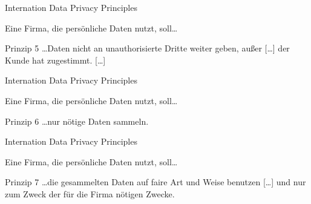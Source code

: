 \begin{frame}{Internation Data Privacy Principles}


    Eine Firma, die persönliche Daten nutzt, soll\dots

    \begin{block}{Prinzip 5 \cite{zankl_international_2014}}
        \dots Daten nicht an unauthorisierte Dritte weiter geben, außer [\dots] der Kunde hat zugestimmt. [\dots] 
    \end{block}


\end{frame}

\begin{frame}{Internation Data Privacy Principles}


    Eine Firma, die persönliche Daten nutzt, soll\dots

    \begin{block}{Prinzip 6 \cite{zankl_international_2014}}
        \dots nur nötige Daten sammeln.
    \end{block}


\end{frame}

\begin{frame}{Internation Data Privacy Principles}

    Eine Firma, die persönliche Daten nutzt, soll\dots

    \begin{block}{Prinzip 7 \cite{zankl_international_2014}}
        \dots die gesammelten Daten auf faire Art und Weise benutzen [\dots] und nur zum Zweck der für die Firma nötigen Zwecke.
    \end{block}


\end{frame}

